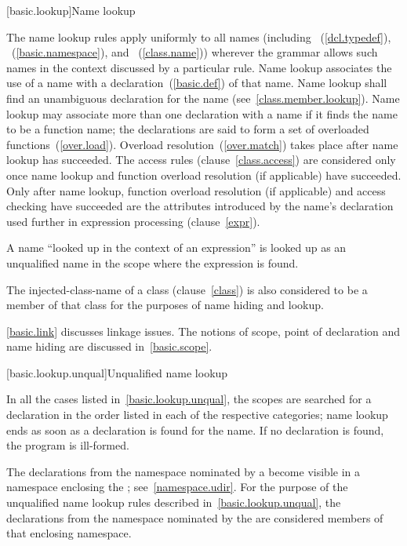 [basic.lookup]{Name lookup}%
%
%

\pnum
The name lookup rules apply uniformly to all names (including
~(\ref{dcl.typedef}),
~(\ref{basic.namespace}), and
~(\ref{class.name})) wherever the grammar allows
such names in the context discussed by a particular rule. Name lookup
associates the use of a name with a declaration~(\ref{basic.def}) of
that name. Name lookup shall find an unambiguous declaration for the
name (see~\ref{class.member.lookup}). Name lookup may associate more
than one declaration with a name if it finds the name to be a function
name; the declarations are said to form a set of overloaded
functions~(\ref{over.load}). Overload resolution~(\ref{over.match})
takes place after name lookup has succeeded. The access rules
(clause~\ref{class.access}) are considered only once name lookup and
function overload resolution (if applicable) have succeeded. Only after
name lookup, function overload resolution (if applicable) and access
checking have succeeded are the attributes introduced by the name's
declaration used further in expression processing (clause~\ref{expr}).

\pnum
A name ``looked up in the context of an expression'' is looked up as an
unqualified name in the scope where the expression is found.

\pnum
The injected-class-name of a class (clause~\ref{class}) is also
considered to be a member of that class for the purposes of name hiding
and lookup.

\pnum
\enternote \ref{basic.link} discusses linkage issues. The notions of
scope, point of declaration and name hiding are discussed
in~\ref{basic.scope}. \exitnote

[basic.lookup.unqual]{Unqualified name lookup}

\pnum
{}%
%
In all the cases listed in~\ref{basic.lookup.unqual}, the scopes are
searched for a declaration in the order listed in each of the respective
categories; name lookup ends as soon as a declaration is found for the
name. If no declaration is found, the program is ill-formed.

\pnum
The declarations from the namespace nominated by a
 become visible in a namespace enclosing the
; see~\ref{namespace.udir}. For the purpose of
the unqualified name lookup rules described
in~\ref{basic.lookup.unqual}, the declarations from the namespace
nominated by the  are considered members of
that enclosing namespace.

